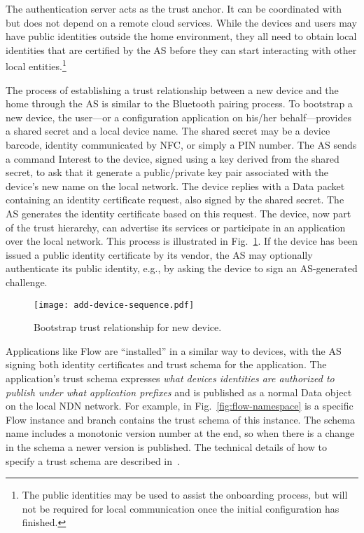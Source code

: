 The authentication server acts as the trust anchor. It can be coordinated with but does not depend on a remote cloud services.
While the devices and users may have public identities outside the home environment, they all need to obtain local identities that are certified by the AS before they can start interacting with other local entities.\footnote{The public identities may be used to assist the onboarding process, but will not be required for local communication once the initial configuration has finished.}

The process of establishing a trust relationship between a new device and the home through the AS is similar to the Bluetooth pairing process.
To bootstrap a new device, the user---or a configuration application on his/her behalf---provides a shared secret and a local device name.  The shared secret may be a device barcode, identity communicated by NFC, or simply a PIN number. 
The AS sends a command Interest to the device, signed using a key derived from the shared secret, to ask that it generate a public/private key pair associated with the device's new name on the local network.  The device replies with a Data packet containing an identity certificate request, also signed by the shared secret.
The AS generates the identity certificate based on this request.  The device, now part of the trust hierarchy, can advertise its services or participate in an application over the local network.
This process is illustrated in Fig.~\ref{fig:flow-bootstrap}.
If the device has been issued a public identity certificate by its vendor, the AS may optionally authenticate its public identity, e.g., by asking the device to sign an AS-generated challenge.

\begin{figure}[!t]
\centering
\texttt{[image: add-device-sequence.pdf]}
\caption{Bootstrap trust relationship for new device.}
\label{fig:flow-bootstrap}
\end{figure}

Applications like Flow are ``installed'' in a similar way to devices, with the AS signing both identity certificates and trust schema for the application.  The application's trust schema expresses \textit{what devices identities are authorized to publish under what application prefixes} and is published as a normal Data object on the local NDN network. 
For example, in Fig.~\ref{fig:flow-namespace}  is a specific Flow instance and  branch contains the trust schema of this instance.
The schema name includes a monotonic version number at the end, so when there is a change in the schema a newer version is published.
The technical details of how to specify a trust schema are described in~\cite{trust-schema}.

